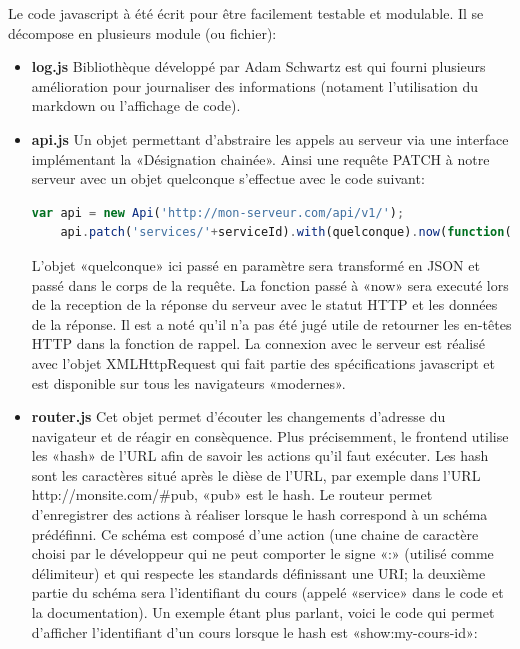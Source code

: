 \documentclass[a4paper,11pt]{report}
\begin{document}
Le code javascript à été écrit pour être facilement testable et modulable. Il se décompose en plusieurs module (ou fichier):

\begin{itemize}
  \item \textbf{log.js} Bibliothèque développé par Adam Schwartz est qui fourni plusieurs amélioration pour journaliser des informations (notament l'utilisation du markdown ou l'affichage de code).
  \item \textbf{api.js} Un objet permettant d'abstraire les appels au serveur via une interface implémentant la «Désignation chainée». Ainsi une requête PATCH à notre serveur avec un objet quelconque s'effectue avec le code suivant:
    \begin{lstlisting}[language=javascript,caption={Requête PATCH à l'api}]
    var api = new Api('http://mon-serveur.com/api/v1/');
    api.patch('services/'+serviceId).with(quelconque).now(function(status, data){});
    \end{lstlisting}
    L'objet «quelconque» ici passé en paramètre sera transformé en JSON et passé dans le corps de la requête. La fonction passé à «now» sera executé lors de la reception de la réponse du serveur avec le statut HTTP et les données de la réponse. Il est a noté qu'il n'a pas été jugé utile de retourner les en-têtes HTTP dans la fonction de rappel. La connexion avec le serveur est réalisé avec l'objet XMLHttpRequest qui fait partie des spécifications javascript et est disponible sur tous les navigateurs «modernes».
  \item \textbf{router.js} Cet objet permet d'écouter les changements d'adresse du navigateur et de réagir en consèquence. Plus précisemment, le frontend utilise les «hash» de l'URL afin de savoir les actions qu'il faut exécuter. Les hash sont les caractères situé après le dièse de l'URL, par exemple dans l'URL http://monsite.com/\#pub, «pub» est le hash.
  Le routeur permet d'enregistrer des actions à réaliser lorsque le hash correspond à un schéma prédéfinni. Ce schéma est composé d'une action (une chaine de caractère choisi par le développeur qui ne peut comporter le signe «:» (utilisé comme délimiteur) et qui respecte les standards définissant une URI; la deuxième partie du schéma sera l'identifiant du cours (appelé «service» dans le code et la documentation).
  Un exemple étant plus parlant, voici le code qui permet d'afficher l'identifiant d'un cours lorsque le hash est «show:my-cours-id»:
    \begin{lstlisting}[language=javascript,caption={Affichage identifiant avec le routeur}]

\end{lstlisting}
\end{itemize}
\end{document}
